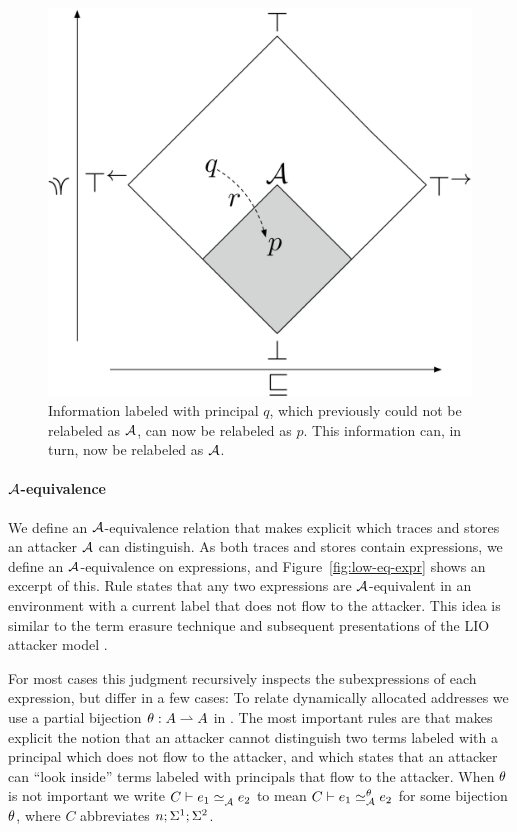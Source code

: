 \begin{figure}
    \centering
    \includegraphics[scale=0.20]{Illustrations/bad-flow.pdf}
    \caption{Information labeled with principal $q$, which previously could not be relabeled as $\mathcal{A}$, can now be relabeled as $p$. This information can, in turn, now be relabeled as $\mathcal{A}$.}
    \label{fig:bad-release}
\end{figure}

\paragraph{$\mathcal{A}$-equivalence}
We define an $\mathcal{A}$-equivalence relation that makes explicit which traces and stores an attacker $\mathcal{A}$ can distinguish. As both traces and stores contain expressions, we define an $\mathcal{A}$-equivalence on expressions, and Figure~\ref{fig:low-eq-expr} shows an excerpt of this. Rule  states that any two expressions are $\mathcal{A}$-equivalent in an environment with a current label that does not flow to the attacker. This idea is similar to the term erasure technique \cite{SRMMlio} and subsequent presentations of the LIO attacker model \cite{Stefan:2012:ACT:2364527.2364557, 10.1007/978-3-642-40203-6_40, 10.1007/978-3-319-24858-5_13}.

For most cases this judgment recursively inspects the subexpressions of each expression, but differ in a few cases: To relate dynamically allocated addresses we use a partial bijection \cite{Banerjee:2002:SIF:794201.795164} $\theta: A \rightharpoonup A$ in . The most important rules are  that makes explicit the notion that an attacker cannot distinguish two terms labeled with a principal which does not flow to the attacker, and  which states that an attacker can ``look inside'' terms labeled with principals that flow to the attacker. When $\theta$ is not important we write $\loweq{C}{\Attacker}{\expr_1}{\expr_2}$ to mean $\loweq{C}{\Attacker}[\bijection]{\expr_1}{\expr_2}$ for some bijection $\theta$, where $C$ abbreviates $n; \Sigma^1; \Sigma^2$.

